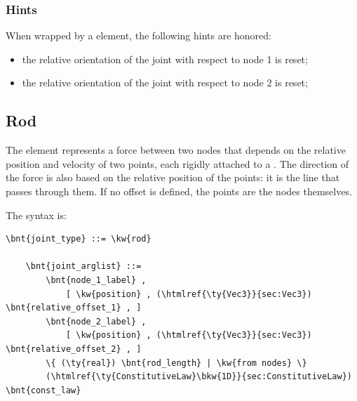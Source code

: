 \subsubsection{Hints}
When wrapped by a  element, the following hints are honored:
\begin{itemize}
\item {} the relative orientation of the joint
with respect to node 1 is reset;
\item {} the relative orientation of the joint
with respect to node 2 is reset;
\end{itemize}





\subsection{Rod}\label{sec:EL:STRUCT:JOINT:ROD}
The  element represents a force between two nodes that depends
on the relative position and velocity of two points, each rigidly attached
to a .
The direction of the force is also based on the relative position
of the points: it is the line that passes through them.
If no offset is defined, the points are the nodes themselves.

The syntax is:
\begin{Verbatim}[commandchars=\\\{\}]
    \bnt{joint_type} ::= \kw{rod}

    \bnt{joint_arglist} ::=
        \bnt{node_1_label} ,
            [ \kw{position} , (\htmlref{\ty{Vec3}}{sec:Vec3}) \bnt{relative_offset_1} , ]
        \bnt{node_2_label} , 
            [ \kw{position} , (\htmlref{\ty{Vec3}}{sec:Vec3}) \bnt{relative_offset_2} , ]
        \{ (\ty{real}) \bnt{rod_length} | \kw{from nodes} \}
        (\htmlref{\ty{ConstitutiveLaw}\bkw{1D}}{sec:ConstitutiveLaw}) \bnt{const_law}
\end{Verbatim}

